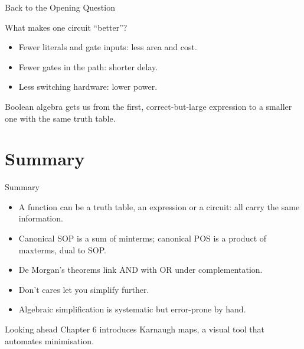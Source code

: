 \documentclass[9pt,aspectratio=169,xcolor=table]{beamer}
\begin{document}
\begin{frame}{Back to the Opening Question}
  \begin{block}{What makes one circuit ``better''?}
    \begin{itemize}\small\itemsep3pt
      \item Fewer \alert{literals} and \alert{gate inputs}: less area and cost.
      \item Fewer gates in the path: shorter \alert{delay}.
      \item Less switching hardware: lower \alert{power}.
    \end{itemize}
  \end{block}
  Boolean algebra gets us from the first, correct-but-large expression to a smaller one with the same truth table.
\end{frame}

\section{Summary}

\begin{frame}{Summary}
  \begin{itemize}\itemsep3pt\small
    \item A function can be a truth table, an expression or a circuit: all carry the same information.
    \item \alert{Canonical SOP} is a sum of minterms; \alert{canonical POS} is a product of maxterms, dual to SOP.
    \item \alert{De Morgan's theorems} link AND with OR under complementation.
    \item \alert{Don't cares} let you simplify further.
    \item Algebraic simplification is systematic but error-prone by hand.
  \end{itemize}
  \begin{block}{Looking ahead}
    Chapter 6 introduces Karnaugh maps, a visual tool that automates minimisation.
  \end{block}
\end{frame}
\end{document}
